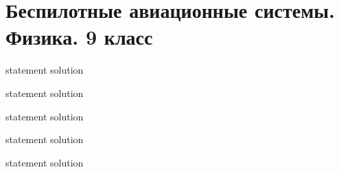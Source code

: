 \chapter{Беспилотные авиационные системы. Физика. 9 класс}

{statement}
{solution}

{statement}
{solution}

{statement}
{solution}

{statement}
{solution}

{statement}
{solution}